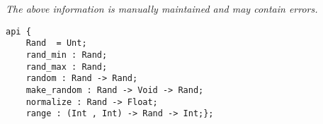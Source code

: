\label{api:Rand}

{\tiny \it The above information is manually maintained and may contain errors.}
\begin{verbatim}
api {
    Rand  = Unt;
    rand_min : Rand;
    rand_max : Rand;
    random : Rand -> Rand;
    make_random : Rand -> Void -> Rand;
    normalize : Rand -> Float;
    range : (Int , Int) -> Rand -> Int;};
\end{verbatim}
